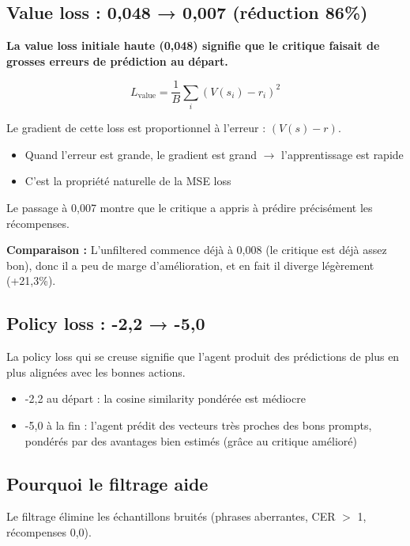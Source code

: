 \documentclass[11pt,a4paper]{article}
\begin{document}
\subsection{Value loss : 0{,}048 → 0{,}007 (réduction 86\%)}

\textbf{La value loss initiale haute (0{,}048) signifie que le critique faisait de grosses erreurs de prédiction au départ.}

\begin{equation}
L_{\text{value}} = \frac{1}{B}\sum_i (V(s_i) - r_i)^2
\end{equation}

Le gradient de cette loss est proportionnel à l'erreur : $(V(s) - r)$.

\begin{itemize}
    \item Quand l'erreur est grande, le gradient est grand $\rightarrow$ l'apprentissage est rapide
    \item C'est la propriété naturelle de la MSE loss
\end{itemize}

Le passage à 0{,}007 montre que le critique a appris à prédire précisément les récompenses.

\textbf{Comparaison :} L'unfiltered commence déjà à 0{,}008 (le critique est déjà assez bon), donc il a peu de marge d'amélioration, et en fait il diverge légèrement (+21{,}3\%).

\subsection{Policy loss : -2{,}2 → -5{,}0}

La policy loss qui se creuse signifie que l'agent produit des prédictions de plus en plus alignées avec les bonnes actions.

\begin{itemize}
    \item -2{,}2 au départ : la cosine similarity pondérée est médiocre
    \item -5{,}0 à la fin : l'agent prédit des vecteurs très proches des bons prompts, pondérés par des avantages bien estimés (grâce au critique amélioré)
\end{itemize}

\subsection{Pourquoi le filtrage aide}

Le filtrage élimine les échantillons bruités (phrases aberrantes, CER $>$ 1, récompenses 0{,}0).
\end{document}
